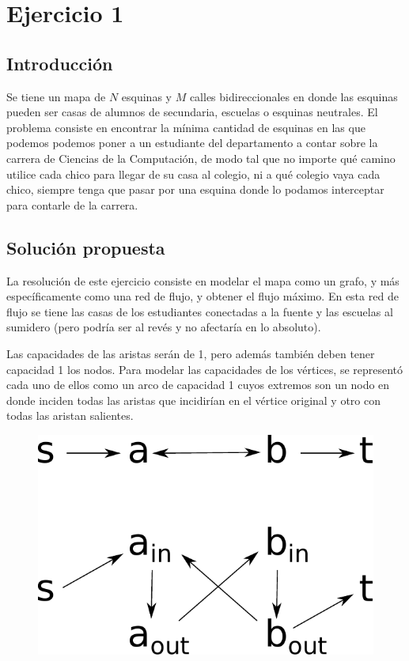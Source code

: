 \section{Ejercicio 1}

\subsection{Introducción}

Se tiene un mapa de $N$ esquinas y $M$ calles bidireccionales en donde las
esquinas pueden ser casas de alumnos de secundaria, escuelas o esquinas
neutrales. El problema consiste en encontrar la mínima cantidad de esquinas en
las que podemos podemos poner a un estudiante del departamento a contar sobre
la carrera de Ciencias de la Computación, de modo tal que no importe qué
camino utilice cada chico para llegar de su casa al colegio, ni a qué colegio
vaya cada chico, siempre tenga que pasar por una esquina donde lo podamos
interceptar para contarle de la carrera.

\subsection{Solución propuesta}

La resolución de este ejercicio consiste en modelar el mapa como un grafo, y
más específicamente como una red de flujo, y obtener el flujo máximo. En esta
red de flujo se tiene las casas de los estudiantes conectadas a la fuente y
las escuelas al sumidero (pero podría ser al revés y no afectaría en lo
absoluto).

Las capacidades de las aristas serán de 1, pero además también deben tener
capacidad 1 los nodos. Para modelar las capacidades de los vértices, se
representó cada uno de ellos como un arco de capacidad 1 cuyos extremos son un
nodo en donde inciden todas las aristas que incidirían en el vértice original
y otro con todas las aristan salientes.

\begin{figure}[H]
\centering
\includegraphics[scale=0.6]{imagenes/ej1_capacidades_nodos.pdf}
\end{figure}

